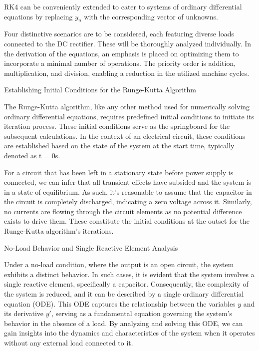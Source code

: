 RK4 can be conveniently extended to cater to systems of ordinary differential equations by replacing $y_n$ with the corresponding vector of unknowns.

Four distinctive scenarios are to be considered, each featuring diverse loads connected to the DC rectifier. These will be thoroughly analyzed individually. In the derivation of the equations, an emphasis is placed on optimizing them to incorporate a minimal number of operations. The priority order is addition, multiplication, and division, enabling a reduction in the utilized machine cycles.

\begin{center}
 Establishing Initial Conditions for the Runge-Kutta Algorithm
\end{center}\leavevmode\newline

The Runge-Kutta algorithm, like any other method used for numerically solving ordinary differential equations, requires predefined initial conditions to initiate its iteration process. These initial conditions serve as the springboard for the subsequent calculations. In the context of an electrical circuit, these conditions are established based on the state of the system at the start time, typically denoted as t = 0s.

For a circuit that has been left in a stationary state before power supply is connected, we can infer that all transient effects have subsided and the system is in a state of equilibrium. As such, it's reasonable to assume that the capacitor in the circuit is completely discharged, indicating a zero voltage across it. Similarly, no currents are flowing through the circuit elements as no potential difference exists to drive them. These constitute the initial conditions at the outset for the Runge-Kutta algorithm's iterations.

\begin{center}
     No-Load Behavior and Single Reactive Element Analysis
\end{center}\leavevmode\newline

Under a no-load condition, where the output is an open circuit, the system exhibits a distinct behavior. In such cases, it is evident that the system involves a single reactive element, specifically a capacitor. Consequently, the complexity of the system is reduced, and it can be described by a single ordinary differential equation (ODE). This ODE captures the relationship between the variables \(y\) and its derivative \(y'\), serving as a fundamental equation governing the system's behavior in the absence of a load. By analyzing and solving this ODE, we can gain insights into the dynamics and characteristics of the system when it operates without any external load connected to it.\\

